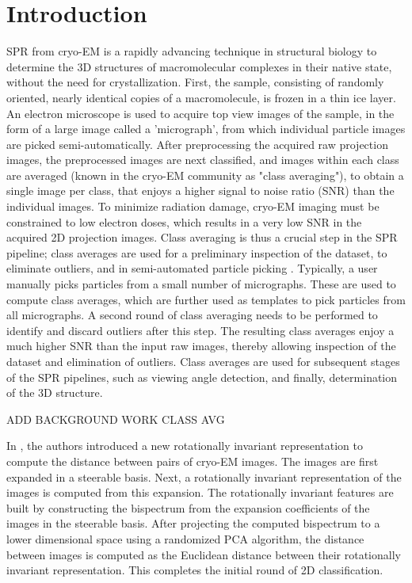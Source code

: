 \documentclass{article}
\begin{document}
\section{Introduction}
\label{sec:intro}
SPR from cryo-EM is a rapidly advancing technique in structural biology to determine
the 3D structures of macromolecular complexes in their native state,
 without the need for crystallization. First, the sample, consisting of randomly oriented, nearly identical copies of a macromolecule, is frozen in a thin ice layer. An electron microscope is used to acquire top view images of the sample, in the form of a large image called a 'micrograph', from which individual particle images are picked semi-automatically. After preprocessing the acquired raw projection images, the preprocessed images are next classified, and images within each class are averaged (known in the cryo-EM community as "class averaging"), to obtain a single image per class, that enjoys a higher signal to noise ratio (SNR) than the individual images. To minimize radiation damage, cryo-EM imaging must be constrained to low electron doses, which results in a very low SNR in the acquired 2D projection images. Class averaging is thus a crucial step in the SPR pipeline; class averages are used for a preliminary inspection of the dataset, to eliminate outliers, and in semi-automated particle picking \cite{relion}. Typically, a user manually picks particles from a small number of micrographs. These are used to compute class averages, which are further used as templates to pick particles from all micrographs. A second round of class averaging needs to be performed to identify and discard outliers after this step. The resulting class averages enjoy a much higher SNR than the input raw images, thereby allowing inspection of the dataset and elimination of outliers. Class averages are used for subsequent stages of the SPR pipelines, such as viewing angle detection, and finally, determination of the 3D structure.
 
ADD BACKGROUND WORK CLASS AVG 

  
In \cite{zhao}, the authors introduced a new rotationally invariant representation to compute the distance between pairs of cryo-EM images. The images are first expanded in a steerable basis. Next, a rotationally invariant representation of the images is computed from this expansion.
The rotationally invariant features are built by constructing the bispectrum from the expansion coefficients of the images in the steerable basis. After projecting the computed bispectrum to a lower dimensional space using a randomized PCA algorithm, the distance between images is computed as the Euclidean distance between their rotationally invariant representation. This completes the initial round of 2D classification. 
\end{document}
